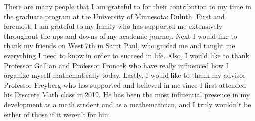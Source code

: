 There are many people that I am grateful to for their contribution to my time in the graduate program at the University of Minnesota: Duluth. First and foremost, I am grateful to my family who has supported me extensively throughout the ups and downs of my academic journey. Next I would like to thank my friends on West 7th in Saint Paul, who guided me and taught me everything I need to know in order to succeed in life. Also, I would like to thank Professor Gallian and Professor Froncek who have really influenced how I organize myself mathematically today. Lastly, I would like to thank my advisor Professor Freyberg who has supported and believed in me since I first attended his Discrete Math class in 2019. He has been the most influential presence in my development as a math student and as a mathematician, and I truly wouldn't be either of those if it weren't for him.